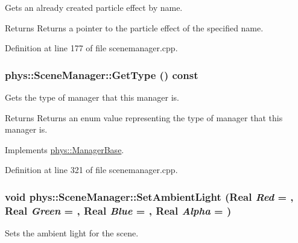 Gets an already created particle effect by name. 

\begin{DoxyReturn}{Returns}
Returns a pointer to the particle effect of the specified name. 
\end{DoxyReturn}


Definition at line 177 of file scenemanager.cpp.

\hypertarget{classphys_1_1SceneManager_af2b4f6bc50d40ffe06f6172c3d1dd02d}{
\subsubsection[{GetType}]{ phys::SceneManager::GetType () const}}
\label{dd/da8/classphys_1_1SceneManager_af2b4f6bc50d40ffe06f6172c3d1dd02d}


Gets the type of manager that this manager is. 

\begin{DoxyReturn}{Returns}
Returns an enum value representing the type of manager that this manager is. 
\end{DoxyReturn}


Implements \hyperlink{classphys_1_1ManagerBase_aff400b6599db635e24796d8221e9a0e3}{phys::ManagerBase}.



Definition at line 321 of file scenemanager.cpp.

\hypertarget{classphys_1_1SceneManager_a686b7199aff8db87af84f40ec933809a}{
\subsubsection[{SetAmbientLight}]{\setlength{\rightskip}{0pt plus 5cm}void phys::SceneManager::SetAmbientLight ({\bf Real} {\em Red} = {}, \/  {\bf Real} {\em Green} = {}, \/  {\bf Real} {\em Blue} = {}, \/  {\bf Real} {\em Alpha} = {})}}
\label{dd/da8/classphys_1_1SceneManager_a686b7199aff8db87af84f40ec933809a}


Sets the ambient light for the scene. 

